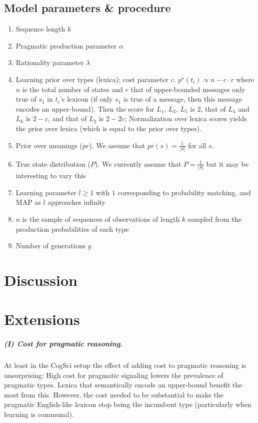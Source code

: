 \documentclass[a4paper]{article}
\begin{document}
\subsection{Model parameters \& procedure} 
\begin{enumerate}
  \item Sequence length $k$
  \item Pragmatic production parameter $\alpha$
  \item Rationality parameter $\lambda$
  \item Learning prior over types (lexica); cost parameter $c$. $p^\star(t_i) \propto n - c \cdot r$ where $n$ is the total number of states and $r$ that of upper-bounded messages only true of $s_1$ in $t_i$'s lexicon (if only $s_1$ is true of a message, then this message encodes an upper-bound). Then the score for $L_1$, $L_3$, $L_5$ is $2$, that of $L_4$ and $L_6$ is $2-c$, and that of $L_2$ is $2-2c$; Normalization over lexica scores yields the prior over lexica (which is equal to the prior over types).   
  \item Prior over meanings ($pr$). We assume that $pr(s) = \frac{1}{|S|}$ for all $s$.
  \item True state distribution ($P$). We currently assume that $P = \frac{1}{|S|}$ but it may be interesting to vary this
  \item Learning parameter $l \geq 1$ with $1$ corresponding to probability matching, and MAP as $l$ approaches infinity
  \item $n$ is the sample of sequences of observations of length $k$ sampled from the production probabilities of each type
  \item Number of generations $g$
\end{enumerate}





\section{Discussion}

\section{Extensions}
\subparagraph{(I) Cost for pragmatic reasoning.} At least in the CogSci setup the effect of adding cost to pragmatic reasoning is unsurprising: High cost for pragmatic signaling lowers the prevalence of pragmatic types. Lexica that semantically encode an upper-bound benefit the most from this. However, the cost needed to be substantial to make the pragmatic English-like lexicon stop being the incumbent type (particularly when learning is communal). 
\end{document}
